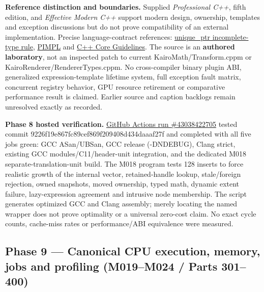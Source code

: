 \textbf{Reference distinction and boundaries.} Supplied \emph{Professional C++}, fifth edition, and \emph{Effective Modern C++} support modern design, ownership, templates and exception discussions but do not prove compatibility of an external implementation. Precise language-contract references: \href{https://en.cppreference.com/w/cpp/memory/unique_ptr}{unique\_ptr incomplete-type rule}, \href{https://en.cppreference.com/w/cpp/language/pimpl}{PIMPL} and \href{https://isocpp.github.io/CppCoreGuidelines/CppCoreGuidelines}{C++ Core Guidelines}. The source is an \textbf{authored laboratory}, not an inspected patch to current KairoMath/Transform.cppm or KairoRenderer/RendererTypes.cppm. No cross-compiler binary plugin ABI, generalized expression-template lifetime system, full exception fault matrix, concurrent registry behavior, GPU resource retirement or comparative performance result is claimed. Earlier source and caption backlogs remain unresolved exactly as recorded.

\textbf{Phase 8 hosted verification.} \href{https://github.com/swayam8624/Project_008_AllMight/actions/runs/43038422705}{GitHub Actions run \#43038422705} tested commit 9226f19e867fc89cef869f209408d434daaaf27f and completed with all five jobs green: GCC ASan/UBSan, GCC release (-DNDEBUG), Clang strict, existing GCC modules/C11/header-unit integration, and the dedicated M018 separate-translation-unit build. The M018 program tests 128 inserts to force realistic growth of the internal vector, retained-handle lookup, stale/foreign rejection, owned snapshots, moved ownership, typed math, dynamic extent failure, lazy-expression agreement and intrusive node membership. The script generates optimized GCC and Clang assembly; merely locating the named wrapper does not prove optimality or a universal zero-cost claim. No exact cycle counts, cache-miss rates or performance/ABI equivalence were measured.

\subsection{Phase 9 --- Canonical CPU execution, memory, jobs and profiling (M019--M024 / Parts 301--400)}\label{appendix-a103e7846d21-phase-9-canonical-cpu-execution-memory-jobs-and-profiling-m019m024-parts-301400}

\hypertarget{appendix-a103e7846d21-phase-9-canonical-cpu-execution-memory-jobs-and-profiling-m019m024-parts-301400}{}

